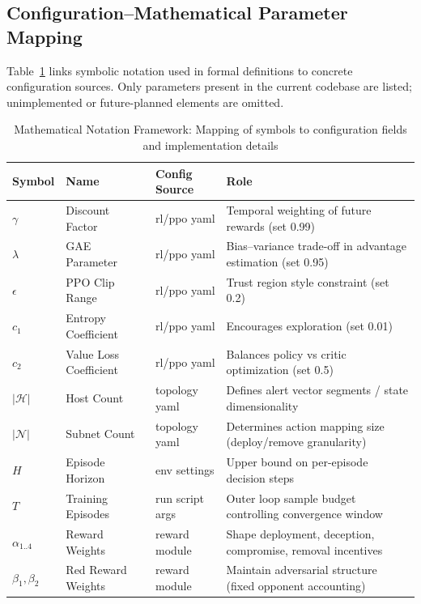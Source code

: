 \documentclass[12pt,oneside]{article}
\begin{document}
\subsection{Configuration--Mathematical Parameter Mapping}

Table~\ref{tab:config_mapping} links symbolic notation used in formal definitions to concrete configuration sources. Only parameters present in the current codebase are listed; unimplemented or future-planned elements are omitted.

\begin{table}[H]
\centering
\caption{Mathematical Notation Framework: Mapping of symbols to configuration fields and implementation details}
\label{tab:config_mapping}
\begin{tabular}{lllp{5.5cm}}
\rowcolor{cwBorder!30} \textbf{Symbol} & \textbf{Name} & \textbf{Config Source} & \textbf{Role} \\
\midrule
$\gamma$ & Discount Factor & rl/ppo yaml & Temporal weighting of future rewards (set 0.99) \\
$\lambda$ & GAE Parameter & rl/ppo yaml & Bias--variance trade-off in advantage estimation (set 0.95) \\
$\epsilon$ & PPO Clip Range & rl/ppo yaml & Trust region style constraint (set 0.2) \\
$c_1$ & Entropy Coefficient & rl/ppo yaml & Encourages exploration (set 0.01) \\
$c_2$ & Value Loss Coefficient & rl/ppo yaml & Balances policy vs critic optimization (set 0.5) \\
$|\mathcal{H}|$ & Host Count & topology yaml & Defines alert vector segments / state dimensionality \\
$|\mathcal{N}|$ & Subnet Count & topology yaml & Determines action mapping size (deploy/remove granularity) \\
$H$ & Episode Horizon & env settings & Upper bound on per-episode decision steps \\
$T$ & Training Episodes & run script args & Outer loop sample budget controlling convergence window \\
$\alpha_{1..4}$ & Reward Weights & reward module & Shape deployment, deception, compromise, removal incentives \\
$\beta_{1},\beta_{2}$ & Red Reward Weights & reward module & Maintain adversarial structure (fixed opponent accounting) \\
\bottomrule
\end{tabular}
\end{table}
\end{document}
